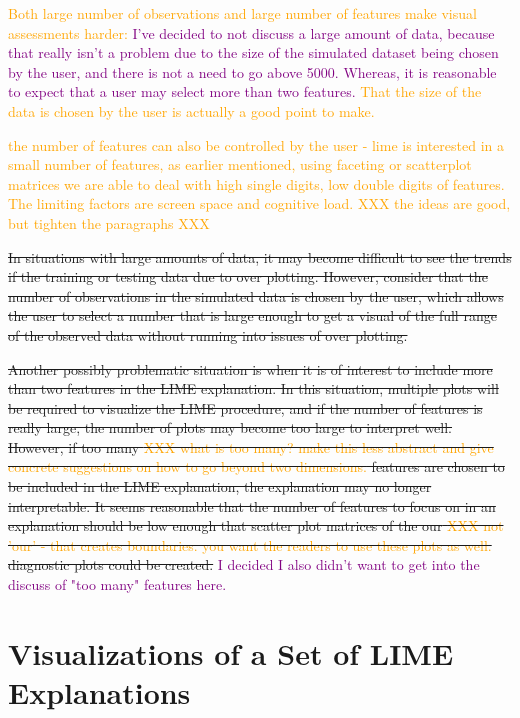 \documentclass[AMS,STIX2COL]{WileyNJD-v2}\usepackage[]{graphicx}\usepackage[]{color}
\newcommand{\hh}[1]{\textcolor{orange}{#1}}
\newcommand{\kgc}[1]{\textcolor{purple}{#1}}
\begin{document}
{\hh{Both large number of observations and large number of features make visual assessments harder:} \kgc{I've decided to not discuss a large amount of data, because that really isn't a problem due to the size of the simulated dataset being chosen by the user, and there is not a need to go above 5000. Whereas, it is reasonable to expect that a user may select more than two features.} \hh{That the size of the data is chosen by the user is actually a good point to make. }

\hh{the number of features can also be controlled by the user - lime is interested in a small number of features, as earlier mentioned, using faceting or scatterplot matrices we are able to deal with high single digits, low double digits of features. The limiting factors are screen space and cognitive load. }
\hh{XXX the ideas are good, but tighten the paragraphs XXX}

\sout{In situations with large amounts of data, it may become difficult to see the trends if the training or testing data due to over plotting. However, consider that the number of observations in the simulated data is chosen by the user, which allows the user to select a number that is large enough to get a visual of the full range of the observed data without running into issues of over plotting.}

\sout{Another possibly problematic situation is when it is of interest to include more than two features in the LIME explanation. In this situation, multiple plots will be required to visualize the LIME procedure, and if the number of features is really large, the number of plots may become too large to interpret well. However, if too many \hh{XXX what is too many? make this less abstract and give concrete suggestions on how to go beyond two dimensions.} features are chosen to be included in the LIME explanation, the explanation may no longer interpretable. It seems reasonable that the number of features to focus on in an explanation should be low enough that scatter plot matrices of the \sout{our} \hh{XXX not 'our' - that creates boundaries. you want the readers to use these plots as well.} diagnostic plots could be created.} \kgc{I decided I also didn't want to get into the discuss of "too many" features here.}

\section{Visualizations of a Set of LIME Explanations} \label{set-visuals}

}
\end{document}
